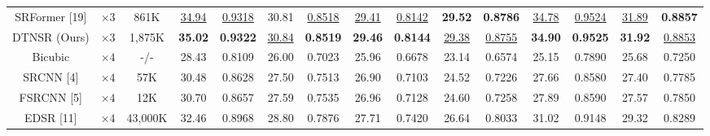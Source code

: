 \documentclass[journal]{IEEEtran}
\begin{document}
\begin{table}
\begin{tabular}{|c|c|c|cc|cc|cc|cc|cc|cc|}
SRFormer [19] & $\times 3$ &861K& \multicolumn{1}{c|}{\color{blue}\underline{34.94}} & {\color{blue}\underline{0.9318}} & \multicolumn{1}{c|}{30.81} &{\color{blue}\underline{ 0.8518}} & \multicolumn{1}{c|}{\color{blue}\underline{29.41}} & {\color{blue}\underline{0.8142}} & \multicolumn{1}{c|}{\color{red}\textbf{29.52}} & {\color{red}\textbf{0.8786}} & \multicolumn{1}{c|}{\color{blue}\underline{34.78}} &{\color{blue}\underline{0.9524}} &\multicolumn{1}{c|}{\color{blue}\underline{31.89}} & {\color{red}\textbf{ 0.8857}}\\

DTNSR (Ours) & $\times 3$ &1,875K& \multicolumn{1}{c|}{\color{red}\textbf{35.02}} &{\color{red}\textbf{0.9322}} & \multicolumn{1}{c|}{\color{blue}\underline{30.84} } &{\color{red}\textbf{ 0.8519}} & \multicolumn{1}{c|}{\color{red}\textbf{29.46}} &{\color{red}\textbf{0.8144}}& \multicolumn{1}{c|}{\color{blue}\underline{29.38}} &{\color{blue}\underline{0.8755}}& \multicolumn{1}{c|}{\color{red}\textbf{34.90}} &{\color{red}\textbf{0.9525}} &\multicolumn{1}{c|}{\color{red}\textbf{31.92}} & {\color{blue}\underline{0.8853}}\\

\hline

Bicubic&$\times4$ &-/-& \multicolumn{1}{c|}{28.43 } &0.8109 & \multicolumn{1}{c|}{26.00  } &0.7023& \multicolumn{1}{c|}{25.96 } & 0.6678  & \multicolumn{1}{c|}{23.14 } & 0.6574  & \multicolumn{1}{c|}{25.15} &0.7890

&\multicolumn{1}{c|}{25.68} &0.7250\\


SRCNN [4] & $\times4$  &57K& \multicolumn{1}{c|}{30.48 } &0.8628   & \multicolumn{1}{c|}{27.50 } &0.7513  &\multicolumn{1}{c|}{ 26.90 } & 0.7103 & \multicolumn{1}{c|}{24.52 } &0.7226 & \multicolumn{1}{c|}{27.66 } &0.8580
&\multicolumn{1}{c|}{ 27.40} &0.7785 \\

FSRCNN [5]& $\times4$ &12K& \multicolumn{1}{c|}{30.70} & 0.8657& \multicolumn{1}{c|}{27.59} &0.7535  &\multicolumn{1}{c|}{26.96} &0.7128 & \multicolumn{1}{c|}{24.60} &0.7258 & \multicolumn{1}{c|}{27.89 } &0.8590
&\multicolumn{1}{c|}{27.57} &0.7850 \\

EDSR [11] & $\times4$ &43,000K& \multicolumn{1}{c|}{32.46} &0.8968& \multicolumn{1}{c|}{28.80} &0.7876 &\multicolumn{1}{c|}{27.71} &0.7420 & \multicolumn{1}{c|}{26.64 } & 0.8033 & \multicolumn{1}{c|}{31.02} & 0.9148
&\multicolumn{1}{c|}{29.32} &0.8289  \\


\end{tabular}
\end{table}
\end{document}
